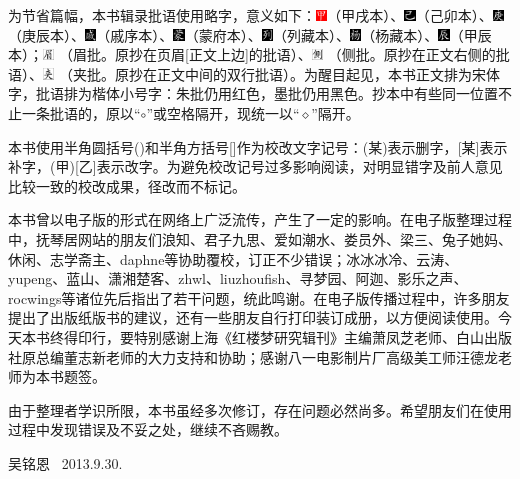 为节省篇幅，本书辑录批语使用略字，意义如下：\includegraphics[width=3mm]{../Images/00002}（甲戌本）、\includegraphics[width=3mm]{../Images/00003}（己卯本）、\includegraphics[width=3mm]{../Images/00004}（庚辰本）、\includegraphics[width=3mm]{../Images/00005}（戚序本）、\includegraphics[width=3mm]{../Images/00006}（蒙府本）、\includegraphics[width=3mm]{../Images/00007}（列藏本）、\includegraphics[width=3mm]{../Images/00008}（杨藏本）、\includegraphics[width=3mm]{../Images/00009}（甲辰本）；\includegraphics[width=3mm]{../Images/00010} （眉批。原抄在页眉{[}正文上边{]}的批语）、\includegraphics[width=3mm]{../Images/00011} （侧批。原抄在正文右侧的批语）、\includegraphics[width=3mm]{../Images/00012}  （夹批。原抄在正文中间的双行批语）。为醒目起见，本书正文排为宋体字，批语排为楷体小号字：朱批仍用红色，墨批仍用黑色。抄本中有些同一位置不止一条批语的，原以“{$\circ$}”或空格隔开，现统一以“{$\diamond$}”隔开。

本书使用半角圆括号()和半角方括号{[}{]}作为校改文字记号：(某)表示删字，{[}某{]}表示补字，(甲){[}乙{]}表示改字。为避免校改记号过多影响阅读，对明显错字及前人意见比较一致的校改成果，径改而不标记。

本书曾以电子版的形式在网络上广泛流传，产生了一定的影响。在电子版整理过程中，抚琴居网站的朋友们浪知、君子九思、爱如潮水、娄员外、梁三、兔子她妈、休闲、志学斋主、daphne等协助覆校，订正不少错误；冰冰冰冷、云涛、yupeng、蓝山、潇湘楚客、zhwl、liuzhoufish、寻梦园、阿迦、影乐之声、rocwings等诸位先后指出了若干问题，统此鸣谢。在电子版传播过程中，许多朋友提出了出版纸版书的建议，还有一些朋友自行打印装订成册，以方便阅读使用。今天本书终得印行，要特别感谢上海《红楼梦研究辑刊》主编萧凤芝老师、白山出版社原总编董志新老师的大力支持和协助；感谢八一电影制片厂高级美工师汪德龙老师为本书题签。

由于整理者学识所限，本书虽经多次修订，存在问题必然尚多。希望朋友们在使用过程中发现错误及不妥之处，继续不吝赐教。

\begin{flushright}
	吴铭恩 ~2013.9.30.
\end{flushright}~~~~
